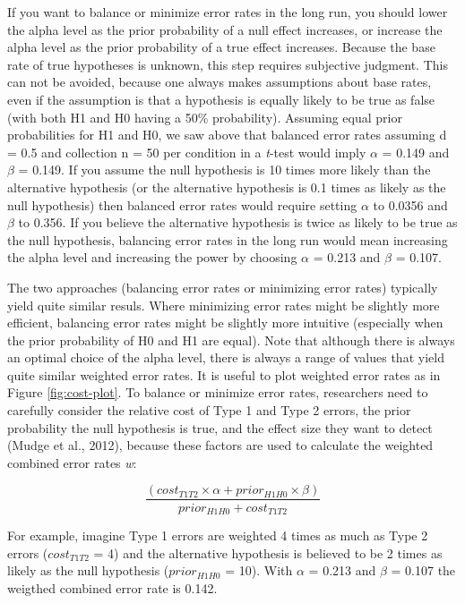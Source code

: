 \documentclass[,jou,floatsintext]{apa6}
\begin{document}
If you want to balance or minimize error rates in the long run, you should lower the alpha level as the prior probability of a null effect increases, or increase the alpha level as the prior probability of a true effect increases. Because the base rate of true hypotheses is unknown, this step requires subjective judgment. This can not be avoided, because one always makes assumptions about base rates, even if the assumption is that a hypothesis is equally likely to be true as false (with both H1 and H0 having a 50\% probability). Assuming equal prior probabilities for H1 and H0, we saw above that balanced error rates assuming d = 0.5 and collection n = 50 per condition in a \emph{t}-test would imply \(\alpha\) = 0.149 and \(\beta\) = 0.149. If you assume the null hypothesis is 10 times more likely than the alternative hypothesis (or the alternative hypothesis is 0.1 times as likely as the null hypothesis) then balanced error rates would require setting \(\alpha\) to 0.0356 and \(\beta\) to 0.356. If you believe the alternative hypothesis is twice as likely to be true as the null hypothesis, balancing error rates in the long run would mean increasing the alpha level and increasing the power by choosing \(\alpha\) = 0.213 and \(\beta\) = 0.107.

The two approaches (balancing error rates or minimizing error rates) typically yield quite similar resuls. Where minimizing error rates might be slightly more efficient, balancing error rates might be slightly more intuitive (especially when the prior probability of H0 and H1 are equal). Note that although there is always an optimal choice of the alpha level, there is always a range of values that yield quite similar weighted error rates. It is useful to plot weighted error rates as in Figure \ref{fig:cost-plot}. To balance or minimize error rates, researchers need to carefully consider the relative cost of Type 1 and Type 2 errors, the prior probability the null hypothesis is true, and the effect size they want to detect (Mudge et al., 2012), because these factors are used to calculate the weighted combined error rates \emph{w}:

\begin{equation}
\frac{(cost_{T1T2} \times \alpha + prior_{H1H0} \times \beta)}{prior_{H1H0}+cost_{T1T2}}
\label{eq:minimize}
\end{equation}

For example, imagine Type 1 errors are weighted 4 times as much as Type 2 errors (\(cost_{T1T2}\) = 4) and the alternative hypothesis is believed to be 2 times as likely as the null hypothesis (\(prior_{H1H0}\) = 10). With \(\alpha\) = 0.213 and \(\beta\) = 0.107 the weigthed combined error rate is 0.142.
\end{document}
